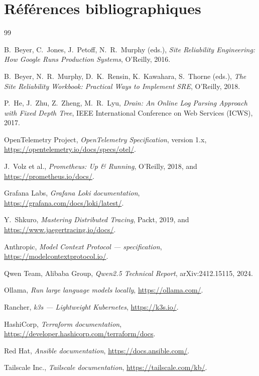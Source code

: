 \documentclass[11pt,a4paper,oneside]{report}
\begin{document}
\chapter*{Références bibliographiques}

\begin{thebibliography}{99}

B.~Beyer, C.~Jones, J.~Petoff, N.~R.~Murphy (eds.),
\emph{Site Reliability Engineering: How Google Runs Production Systems},
O'Reilly, 2016.

B.~Beyer, N.~R.~Murphy, D.~K.~Rensin, K.~Kawahara, S.~Thorne (eds.),
\emph{The Site Reliability Workbook: Practical Ways to Implement SRE},
O'Reilly, 2018.

P.~He, J.~Zhu, Z.~Zheng, M.~R.~Lyu, \emph{Drain: An Online Log Parsing
Approach with Fixed Depth Tree}, IEEE International Conference on Web
Services (ICWS), 2017.

OpenTelemetry Project,
\emph{OpenTelemetry Specification}, version 1.x,
\url{https://opentelemetry.io/docs/specs/otel/}.

J.~Volz et al.,
\emph{Prometheus: Up \& Running}, O'Reilly, 2018, and
\url{https://prometheus.io/docs/}.

Grafana Labs,
\emph{Grafana Loki documentation}, \url{https://grafana.com/docs/loki/latest/}.

Y.~Shkuro,
\emph{Mastering Distributed Tracing}, Packt, 2019,
and \url{https://www.jaegertracing.io/docs/}.

Anthropic,
\emph{Model Context Protocol --- specification},
\url{https://modelcontextprotocol.io/}.

Qwen Team, Alibaba Group,
\emph{Qwen2.5 Technical Report},
arXiv:2412.15115, 2024.

Ollama,
\emph{Run large language models locally},
\url{https://ollama.com/}.

Rancher,
\emph{k3s --- Lightweight Kubernetes},
\url{https://k3s.io/}.

HashiCorp,
\emph{Terraform documentation},
\url{https://developer.hashicorp.com/terraform/docs}.

Red Hat,
\emph{Ansible documentation},
\url{https://docs.ansible.com/}.

Tailscale Inc.,
\emph{Tailscale documentation},
\url{https://tailscale.com/kb/}.

\end{thebibliography}
\end{document}
